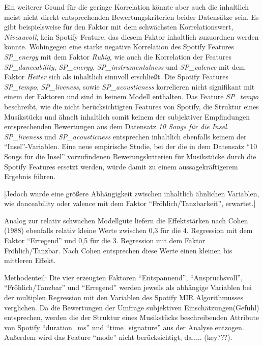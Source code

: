 Ein weiterer Grund für die geringe Korrelation könnte aber auch die inhaltlich meist nicht direkt entsprechenden Bewertungskriterien beider Datensätze sein.
Es gibt beispielsweise für den Faktor mit dem schwächsten Korrelationswert, \textit{Niveauvoll}, kein Spotify Feature, das diesem Faktor inhaltlich zuzuordnen werden könnte. 
Wohingegen eine starke negative Korrelation des Spotify Features \textit{SP\_energy} mit dem Faktor \textit{Ruhig}, wie auch die Korrelation der Features \textit{SP\_danceability}, \textit{SP\_energy}, \textit{SP\_instrumentalness} und \textit{SP\_valence} mit dem Faktor \textit{Heiter} sich als inhaltlich sinnvoll erschließt.
Die Spotify Features \textit{SP\_tempo}, \textit{SP\_liveness}, sowie \textit{SP\_acousticness} korrelieren nicht signifikant mit einem der Faktoren und sind in keinem Modell enthalten. 
Das Feature \textit{SP\_tempo} beschreibt, wie die nicht berücksichtigten Features von Spotify, die Struktur eines Musikstücks und ähnelt inhaltlich somit keinem der subjektiver Empfindungen entsprechenden Bewertungen aus dem Datensatz \textit{10 Songs für die Insel}.
\textit{SP\_liveness} und \textit{SP\_acousticness} entsprechen inhaltlich ebenfalls keinem der ``Insel''-Variablen.  
Eine neue empirische Studie, bei der die in dem Datensatz ``10 Songs für die Insel'' vorzufindenen Bewerungskriterien für Musikstücke durch die Spotify Features ersetzt werden, würde damit zu einem aussagekräftigerem Ergebnis führen.



[Jedoch wurde eine größere Abhängigkeit zwischen inhaltlich ähnlichen Variablen, wie danceability oder valence mit dem Faktor ``Fröhlich/Tanzbarkeit'', erwartet.]


Analog zur relativ schwachen Modellgüte liefern die Effektstärken nach Cohen (1988) ebenfalls relativ kleine Werte zwischen 0,3 für die 4. Regression mit dem Faktor ``Erregend'' und 0,5 für die 3.
Regression mit dem Faktor Fröhlich/Tanzbar.
Nach Cohen entsprechen diese Werte einen kleinen bis mittleren Effekt.


Methodenteil: Die vier erzeugten Faktoren ``Entspannend'', ``Anspruchsvoll'', ``Fröhlich/Tanzbar'' und ``Erregend'' werden jeweils als abhängige Variablen bei der multiplen Regression mit den Variablen des Spotify MIR Algorithmusses verglichen.
Da die Bewertungen der Umfrage subjektiven Einschätzungen(Gefühl) entsprechen, werden die der Struktur eines Musikstücks beschreibenden Attribute von Spotify ``duration\_ms'' und ``time\_signature'' aus der Analyse entzogen.
Außerdem wird das Feature ``mode'' nicht berücksichtigt, da..... (key???).
